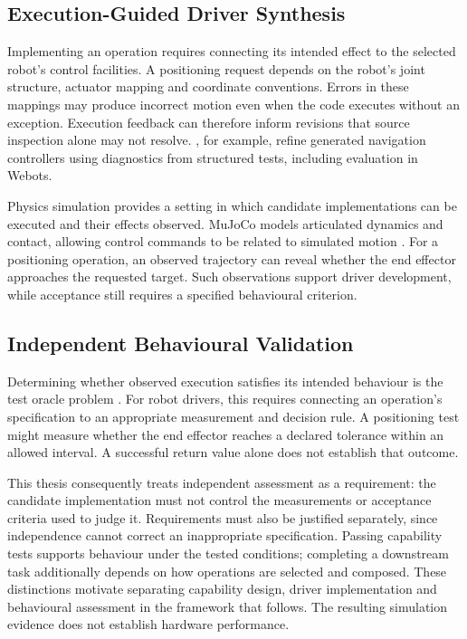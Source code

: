 \subsection{Execution-Guided Driver Synthesis}

Implementing an operation requires connecting its intended effect to the
selected robot's control facilities. A positioning request depends on the
robot's joint structure, actuator mapping and coordinate conventions. Errors
in these mappings may produce incorrect motion even when the code executes
without an exception. Execution feedback can therefore inform revisions that
source inspection alone may not resolve. \citet{tripathi2026testdriven}, for
example, refine generated navigation controllers using diagnostics from
structured tests, including evaluation in Webots.

Physics simulation provides a setting in which candidate implementations can
be executed and their effects observed. MuJoCo models articulated dynamics
and contact, allowing control commands to be related to simulated motion
\citep{todorov2012mujoco}. For a positioning operation, an observed trajectory
can reveal whether the end effector approaches the requested target. Such
observations support driver development, while acceptance still requires a
specified behavioural criterion.

\subsection{Independent Behavioural Validation}

Determining whether observed execution satisfies its intended behaviour is
the test oracle problem \citep{barr2015oracle}. For robot drivers, this requires
connecting an operation's specification to an appropriate measurement and
decision rule. A positioning test might measure whether the end effector
reaches a declared tolerance within an allowed interval. A successful return
value alone does not establish that outcome.

This thesis consequently treats independent assessment as a requirement: the
candidate implementation must not control the measurements or acceptance
criteria used to judge it. Requirements must also be justified separately,
since independence cannot correct an inappropriate specification. Passing
capability tests supports behaviour under the tested conditions; completing
a downstream task additionally depends on how operations are selected and
composed. These distinctions motivate separating capability design, driver
implementation and behavioural assessment in the framework that follows. The
resulting simulation evidence does not establish hardware performance.

